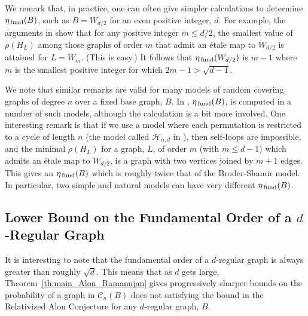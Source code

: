 \documentclass{memo-l}
\newcommand{\etafund}{{\eta_{\rm \,fund}}}
\theoremstyle{plain}
\theoremstyle{definition}
\numberwithin{section}{chapter}
\numberwithin{equation}{chapter}
\theoremstyle{plain}
\theoremstyle{definition}
\newcommand\cC{\mathcal{C}}
\begin{document}
We remark that, in practice, one can often give simpler calculations
to determine $\etafund(B)$, such as $B=W_{d/2}$ for an even positive
integer, $d$.  For example, the arguments
in \cite{friedman_alon} show that for any positive integer
$m\le d/2$,
the smallest value of $\rho(H_L)$ among those graphs of order $m$
that admit an \'etale map to $W_{d/2}$ is attained for $L=W_m$.
(This is easy.)
It follows that $\etafund(W_{d/2})$ is $m-1$ where $m$ is the smallest
positive integer for which
$2m-1>\sqrt{d-1}$.

We note that similar remarks are valid for many models of random covering
graphs of degree $n$ over a fixed base graph, $B$.
In \cite{friedman_alon}, $\etafund(B)$, is computed in a number of
such models,
although the calculation is a bit more involved.  One interesting
remark is that if we use a model where each permutation is restricted
to a cycle of length $n$ (the model called ${\mathcal H}_{n,d}$ 
in \cite{friedman_alon}), then self-loops are impossible, and 
the minimal $\rho(H_L)$ for a graph, $L$, of order $m$ (with $m\le d-1$)
which admits an \'etale map to $W_{d/2}$, is a graph with two vertices
joined by $m+1$ edges.  This gives an $\etafund(B)$ which is roughly
twice that of the Broder-Shamir model.
In particular, two simple and natural models can have
very different $\etafund(B)$.


\subsection{Lower Bound on the Fundamental Order of a $d$-Regular Graph}

It is interesting to note that the fundamental order of a $d$-regular
graph is always greater than roughly $\sqrt{d}$.  This means that
as $d$ gets large, Theorem~\ref{th:main_Alon_Ramanujan} gives progressively
sharper bounds on
the probability of a graph in $\cC_n(B)$ does
not satisfying the bound in the Relativized
Alon Conjecture for any $d$-regular graph, $B$.
\end{document}
